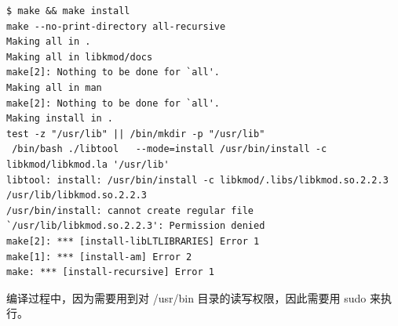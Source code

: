 {\begin{shaded}\begin{verbatim}
$ make && make install
make --no-print-directory all-recursive
Making all in .
Making all in libkmod/docs
make[2]: Nothing to be done for `all'.
Making all in man
make[2]: Nothing to be done for `all'.
Making install in .
test -z "/usr/lib" || /bin/mkdir -p "/usr/lib"
 /bin/bash ./libtool   --mode=install /usr/bin/install -c   libkmod/libkmod.la '/usr/lib'
libtool: install: /usr/bin/install -c libkmod/.libs/libkmod.so.2.2.3 /usr/lib/libkmod.so.2.2.3
/usr/bin/install: cannot create regular file `/usr/lib/libkmod.so.2.2.3': Permission denied
make[2]: *** [install-libLTLIBRARIES] Error 1
make[1]: *** [install-am] Error 2
make: *** [install-recursive] Error 1
\end{verbatim}\end{shaded}}
编译过程中，因为需要用到对 /usr/bin 目录的读写权限，因此需要用 sudo
来执行。

